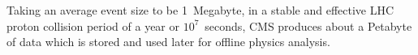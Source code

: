 Taking an average event size to be 1~Megabyte, in a stable and effective LHC proton collision period of a year or $10^{7}$~seconds, CMS produces about a Petabyte of data which is stored and used later for offline physics analysis.
\label{Collider_And_Detector_chapter}

